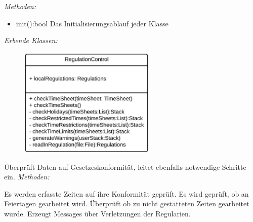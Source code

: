         \begin{itemize}
            \newline
                \emph{Methoden:}
                \begin{itemize}
                    \item{init():bool}
                        Das Initialisierungsablauf jeder Klasse
                \end{itemize}
                \emph{Erbende Klassen:}
                \begin{itemize}
                    \begin{figure}[htb]
                    \centering
                    \includegraphics[width=6.5cm]{Diagramms/class/singleclass/ControlReg.pdf}
                    \end{figure}
                    \newline
                       Überprüft Daten auf Gesetzeskonformität, leitet ebenfalls notwendige Schritte ein.
                                                          \newline
                    \emph{Methoden:}
                       \begin{itemize}
                            Es werden erfasste Zeiten auf ihre Konformität geprüft.
                            Es wird geprüft, ob an Feiertagen gearbeitet wird.
                            Überprüft ob zu nicht gestatteten Zeiten gearbeitet wurde.
                            Erzeugt Messages über Verletzungen der Regularien.
                       \end{itemize}


\end{itemize}
\end{itemize}
